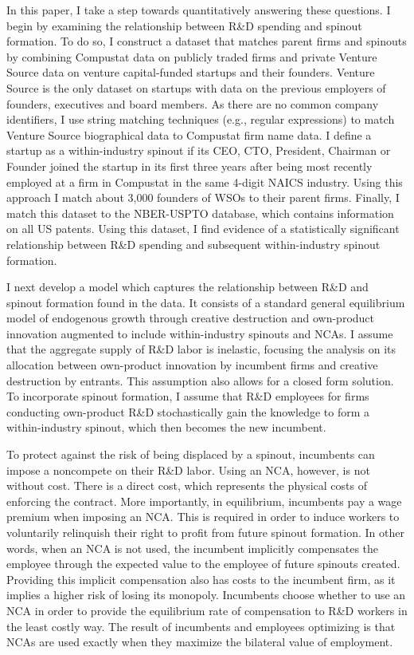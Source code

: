 \documentclass[11pt,english]{article}
\theoremstyle{definition}
\begin{document}
In this paper, I take a step towards quantitatively answering these questions. I begin by examining the relationship between R\&D spending and spinout formation. To do so, I construct a dataset that matches parent firms and spinouts by combining Compustat data on publicly traded firms and private Venture Source data on venture capital-funded startups and their founders. Venture Source is the only dataset on startups with data on the previous employers of founders, executives and board members. As there are no common company identifiers, I use string matching techniques (e.g., regular expressions) to match Venture Source biographical data to Compustat firm name data. I define a startup as a within-industry spinout if its CEO, CTO, President, Chairman or Founder joined the startup in its first three years after being most recently employed at a firm in Compustat in the same 4-digit NAICS industry. Using this approach I match about 3,000 founders of WSOs to their parent firms. Finally, I match this dataset to the NBER-USPTO database, which contains information on all US patents. Using this dataset, I find evidence of a statistically significant relationship between R\&D spending and subsequent within-industry spinout formation. 

I next develop a model which captures the relationship between R\&D and spinout formation found in the data. It consists of a standard general equilibrium model of endogenous growth through creative destruction and own-product innovation augmented to include within-industry spinouts and NCAs. I assume that the aggregate supply of R\&D labor is inelastic, focusing the analysis on its allocation between own-product innovation by incumbent firms and creative destruction by entrants. This assumption also allows for a closed form solution. To incorporate spinout formation, I assume that R\&D employees for firms conducting own-product R\&D stochastically gain the knowledge to form a within-industry spinout, which then becomes the new incumbent. 

To protect against the risk of being displaced by a spinout, incumbents can impose a noncompete on their R\&D labor. Using an NCA, however, is not without cost. There is a direct cost, which represents the physical costs of enforcing the contract. More importantly, in equilibrium, incumbents pay a wage premium when imposing an NCA. This is required in order to induce workers to voluntarily relinquish their right to profit from future spinout formation. In other words, when an NCA is not used, the incumbent implicitly compensates the employee through the expected value to the employee of future spinouts created. Providing this implicit compensation also has costs to the incumbent firm, as it implies a higher risk of losing its monopoly. Incumbents choose whether to use an NCA in order to provide the equilibrium rate of compensation to R\&D workers in the least costly way. The result of incumbents and employees optimizing is that NCAs are used exactly when they maximize the bilateral value of employment. 
\end{document}
